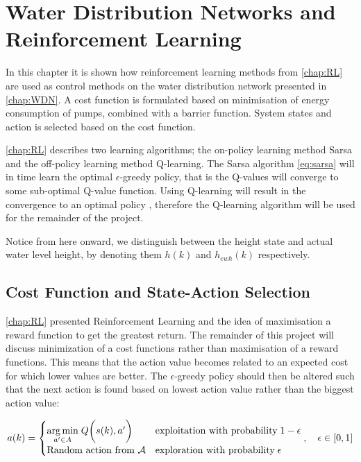 \chapter{Water Distribution Networks and Reinforcement Learning}\label{chap:RLOnWDN}

In this chapter it is shown how reinforcement learning methods from \cref{chap:RL} are used as control methods on the water distribution network presented in \cref{chap:WDN}. A cost function is formulated based on minimisation of energy consumption of pumps, combined with a barrier function. System states and action is selected based on the cost function.

\cref{chap:RL} describes two learning algorithms; the on-policy learning method Sarsa and the off-policy learning method Q-learning. The Sarsa algorithm \cref{eq:sarsa} will in time learn the optimal $ \epsilon $-greedy policy, that is the Q-values will converge to some sub-optimal Q-value function. Using Q-learning will result in the convergence to an optimal policy \cite{Sutton2020}, therefore the Q-learning algorithm will be used for the remainder of the project.  

Notice from here onward, we distinguish between the height state and actual water level height, by denoting them $h(k)$ and $h_{ewh}(k)$ respectively.

\newpage \clearpage

\section{Cost Function and State-Action Selection}\label{sec:CostFuncAndState-ActionSelection}
\cref{chap:RL} presented Reinforcement Learning and the idea of maximisation a reward function to get the greatest return. The remainder of this project will discuss minimization of a cost functions rather than maximisation of a reward functions. This means that the action value becomes related to an expected cost for which lower values are better. The $\epsilon$-greedy policy should then be altered such that the next action is found based on lowest action value rather than the biggest action value:

\begin{equation}\label{eq:EpsilonGreedyMin}
	a(k) = 
	\begin{cases} 
		\underset{a'\in A}{\arg\min} \; Q\bigg(s(k),a'\bigg) & \text{exploitation with probability} \; 1-\epsilon  \\
		\text{Random action from $ \mathcal{A} $} & \text{exploration with probability} \; \epsilon 
	\end{cases},\quad \epsilon \in [0,1]
\end{equation}


